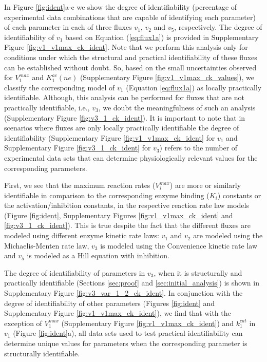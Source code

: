 \documentclass[10pt]{article}
\begin{document}
	In Figure \ref{fig:ident}a-c we show the degree of identifiability (percentage of experimental data combinations that are capable of identifying each parameter) of each parameter in each of three fluxes $v_1$, $v_2$ and $v_5$, respectively. The degree of identifiability of $v_1$ based on Equation (\ref{eq:flux1a}) is provided in Supplementary Figure \ref{fig:v1_v1max_ck_ident}. Note that we perform this analysis only for conditions under which the structural and practical identifiability of these fluxes can be established without doubt. So, based on the small uncertainties observed for $V_1^{max}$ and $K_1^{ac} (ne)$ (Supplementary Figure \ref{fig:v1_v1max_ck_values}), we classify the corresponding model of $v_1$ (Equation \ref{eq:flux1a}) as locally practically identifiable. Although, this analysis can be performed for fluxes that are not practically identifiable, i.e., $v_3$, we doubt the meaningfulness of such an analysis (Supplementary Figure \ref{fig:v3_1_ck_ident}). It is important to note that in scenarios where fluxes are only locally practically identifiable the degree of identifiability (Supplementary Figure \ref{fig:v1_v1max_ck_ident} for $v_1$ and Supplementary Figure \ref{fig:v3_1_ck_ident} for $v_3$) refers to the number of experimental data sets that can determine physiologically relevant values for the corresponding parameters.
	
	First, we see that the maximum reaction rates ($V_i^{max}$) are more or similarly identifiable in comparison to the corresponding enzyme binding ($K_i$) constants or the activation/inhibition constants, in the respective reaction rate law models (Figure \ref{fig:ident}, Supplementary Figures \ref{fig:v1_v1max_ck_ident} and \ref{fig:v3_1_ck_ident}). This is true despite the fact that the different fluxes are modeled using different enzyme kinetic rate laws: $v_1$ and $v_2$ are modeled using the Michaelis-Menten rate law, $v_3$ is modeled using the Convenience kinetic rate law and $v_5$ is modeled as a Hill equation with inhibition.
	
	The degree of identifiability of parameters in $v_3$, when it is structurally and practically identifiable (Sections \ref{sec:proof} and \ref{sec:initial_analysis}) is shown in Supplementary Figure \ref{fig:v3_var_1_2_ck_ident}. In conjunction with the degree of identifiability of other parameters (Figures \ref{fig:ident} and Supplementary Figure \ref{fig:v1_v1max_ck_ident}), we find that with the exception of $V_1^{max}$ (Supplementary Figure \ref{fig:v1_v1max_ck_ident}) and $k_1^{cat}$ in $v_1$ (Figure \ref{fig:ident}a), all data sets used to test practical identifiability can determine unique values for parameters when the corresponding parameter is structurally identifiable. 	
	
\end{document}
